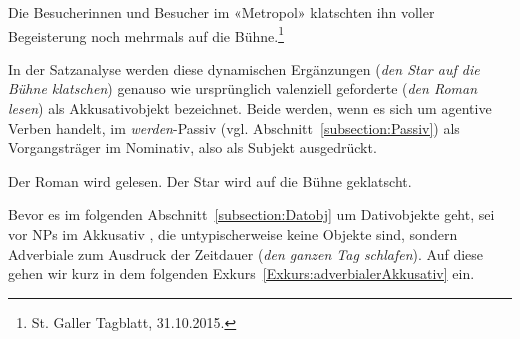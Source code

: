 \ea \label{ea:kausBewBeleg} Die Besucherinnen und Besucher im «Metropol» klatschten ihn voller Begeisterung noch mehrmals auf die Bühne.\footnote{St. Galler Tagblatt, 31.10.2015.} 
\z 

In der Satzanalyse werden diese dynamischen Ergänzungen (\textit{den Star auf die Bühne klatschen}) genauso wie ursprünglich valenziell geforderte (\textit{den Roman lesen}) als Akkusativobjekt bezeichnet. Beide werden, wenn es sich um agentive Verben handelt, im \textit{werden}-Passiv (vgl. Abschnitt~\ref{subsection:Passiv}) als Vorgangsträger im Nominativ, also als Subjekt ausgedrückt.

\ea \label{ea:AkkobjPass}
\ea \label{ea:Romanwirdgelesen} Der Roman wird gelesen.
\ex \label{ex:StaraufBühnegeklatscht} Der Star wird auf die Bühne geklatscht.
\z 
\z 

Bevor es im folgenden Abschnitt~\ref{subsection:Datobj} um Dativobjekte geht, sei vor NPs im Akkusativ , die untypischerweise keine Objekte sind, sondern Adverbiale \zB zum Ausdruck der Zeitdauer (\textit{den ganzen Tag schlafen}). Auf diese gehen wir kurz in dem folgenden Exkurs~\ref{Exkurs:adverbialerAkkusativ} ein.  


